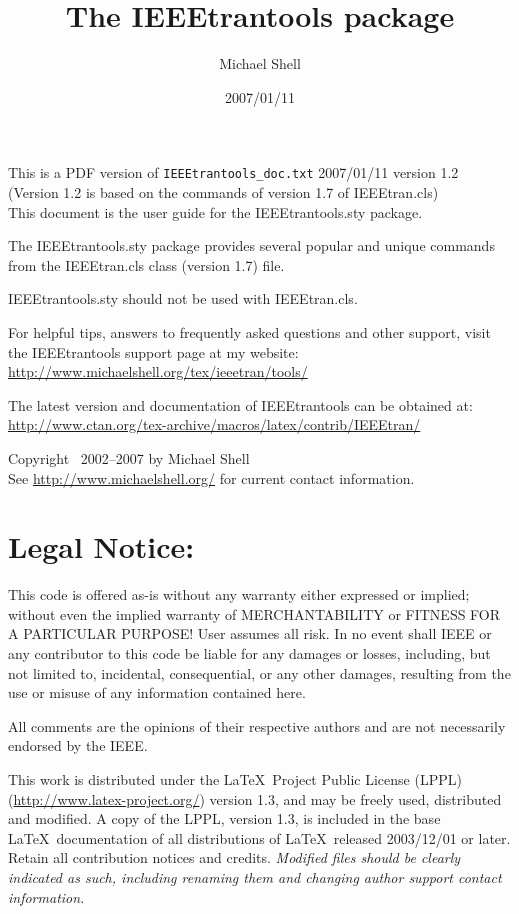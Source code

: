 \documentclass[pagesize=auto]{scrartcl}
\title{The \textsf{IEEEtrantools} package}
\author{Michael Shell}
\date{2007/01/11}
\begin{document}
\maketitle

\tableofcontents

\bigskip

\noindent
This is a PDF version of \texttt{IEEEtrantools\_doc.txt} 2007/01/11 version 1.2
(Version 1.2 is based on the commands of version 1.7 of IEEEtran.cls) \\
This document is the user guide for the \textsf{IEEEtrantools.sty} package.

The \textsf{IEEEtrantools.sty} package provides several popular and unique
commands from the \textsf{IEEEtran.cls} class (version 1.7) file.

\textsf{IEEEtrantools.sty} should not be used with \textsf{IEEEtran.cls}.

For helpful tips, answers to frequently asked questions and other support,
visit the IEEEtrantools support page at my website: \\
\url{http://www.michaelshell.org/tex/ieeetran/tools/}

The latest version and documentation of IEEEtrantools can be obtained at: \\
\url{http://www.ctan.org/tex-archive/macros/latex/contrib/IEEEtran/}

Copyright \textcopyright\ 2002--2007 by Michael Shell \\
See
\url{http://www.michaelshell.org/}
for current contact information.


\section{Legal Notice:}

This code is offered as-is without any warranty either expressed or
implied; without even the implied warranty of MERCHANTABILITY or
FITNESS FOR A PARTICULAR PURPOSE!\@
User assumes all risk.
In no event shall IEEE or any contributor to this code be liable for
any damages or losses, including, but not limited to, incidental,
consequential, or any other damages, resulting from the use or misuse
of any information contained here.

All comments are the opinions of their respective authors and are not
necessarily endorsed by the IEEE.

This work is distributed under the \LaTeX\ Project Public License (LPPL)
(\url{http://www.latex-project.org/}) version 1.3, and may be freely used,
distributed and modified. A copy of the LPPL, version 1.3, is included
in the base \LaTeX\ documentation of all distributions of \LaTeX\ released
2003/12/01 or later.
Retain all contribution notices and credits.
\emph{Modified files should be clearly indicated as such, including
renaming them and changing author support contact information.}
\end{document}
